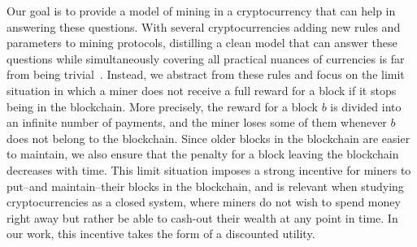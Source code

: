 Our goal is to provide a model of mining in a cryptocurrency that can help in answering these questions. 
With several cryptocurrencies adding new rules and parameters to mining protocols, distilling a clean model that can answer these questions while simultaneously covering 
all practical nuances of currencies is far from being trivial~\cite{mininggames:2016}. 
Instead, 
we abstract from these rules and focus on the limit situation in which a miner does not receive a full reward for a block if it stops being in the blockchain. 
More precisely, the reward for a block $b$ is divided into an infinite number of payments, and the miner loses some of them whenever $b$ does not belong to the blockchain. 
Since older blocks in the blockchain are easier to maintain, we also ensure that the penalty for a block leaving the blockchain decreases with time. 
This limit situation imposes a strong incentive for miners to put--and maintain--their blocks in the blockchain, and is relevant when studying cryptocurrencies
as a closed system, where miners do 
not wish to spend money right away but rather be able to cash-out their wealth at any point in time. 
%
%
In our work, this incentive takes the form of a discounted utility.
